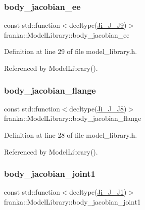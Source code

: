 \subsubsection{\texorpdfstring{body\+\_\+jacobian\+\_\+ee}{body\_jacobian\_ee}}
{\footnotesize\ttfamily const std\+::function$<$decltype(\hyperlink{libfcimodels_8h_aa5f181fbb9b11570d362d24647a17eeb}{Ji\+\_\+\+J\+\_\+\+J9})$>$ franka\+::\+Model\+Library\+::body\+\_\+jacobian\+\_\+ee}



Definition at line 29 of file model\+\_\+library.\+h.



Referenced by Model\+Library().

\mbox{\label{classfranka_1_1ModelLibrary_ac030408b9787df94ebf840cf166552f9}} 
\subsubsection{\texorpdfstring{body\+\_\+jacobian\+\_\+flange}{body\_jacobian\_flange}}
{\footnotesize\ttfamily const std\+::function$<$decltype(\hyperlink{libfcimodels_8h_a3d37aa0f2e52d0b50ca7b9f807608d69}{Ji\+\_\+\+J\+\_\+\+J8})$>$ franka\+::\+Model\+Library\+::body\+\_\+jacobian\+\_\+flange}



Definition at line 28 of file model\+\_\+library.\+h.



Referenced by Model\+Library().

\mbox{\label{classfranka_1_1ModelLibrary_ac4ed7bf7cf48cc53df5849f2b61d98c1}} 
\subsubsection{\texorpdfstring{body\+\_\+jacobian\+\_\+joint1}{body\_jacobian\_joint1}}
{\footnotesize\ttfamily const std\+::function$<$decltype(\hyperlink{libfcimodels_8h_a43ae2c1ca54714ac90313090d1dbba08}{Ji\+\_\+\+J\+\_\+\+J1})$>$ franka\+::\+Model\+Library\+::body\+\_\+jacobian\+\_\+joint1}



